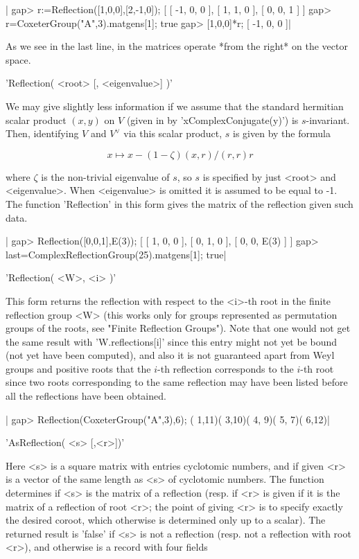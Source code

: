 |    gap> r:=Reflection([1,0,0],[2,-1,0]);
    [ [ -1, 0, 0 ], [ 1, 1, 0 ], [ 0, 0, 1 ] ]
    gap> r=CoxeterGroup("A",3).matgens[1];
    true
    gap> [1,0,0]*r;
    [ -1, 0, 0 ]|

As we see in the last line, in {\GAP} the matrices operate *from the right*
on the vector space.

'Reflection( <root> [, <eigenvalue>] )'

We  may  give   slightly  less  information  if  we   assume  that  the
standard hermitian  scalar product  $(x,y)$ on $V$  (given in  {\GAP} by
'x\*ComplexConjugate(y)') is $s$-invariant.  Then, identifying  $V$ and
$V^\vee$ via this scalar product, $s$ is given by the formula

$$ x\mapsto x-(1-\zeta)(x,r)/(r,r)r$$

where $\zeta$ is the non-trivial eigenvalue of $s$, so $s$ is specified
by just  <root> and  <eigenvalue>. When <eigenvalue>  is omitted  it is
assumed to be equal to -1. The function 'Reflection' in this form gives
the matrix of the reflection given such data.

|    gap> Reflection([0,0,1],E(3));
    [ [ 1, 0, 0 ], [ 0, 1, 0 ], [ 0, 0, E(3) ] ]
    gap> last=ComplexReflectionGroup(25).matgens[1];
    true|

'Reflection( <W>, <i> )'

This  form returns the  reflection with respect  to the <i>-th  root in the
finite  reflection group  <W> (this  works only  for groups  represented as
permutation groups of the roots, see "Finite Reflection Groups"). Note that
one  would not get the same result with 'W.reflections[i]' since this entry
might  not yet be  bound (not yet  have been computed),  and also it is not
guaranteed  apart  from  Weyl  groups  and  positive  roots that the $i$-th
reflection  corresponds to the $i$-th root since two roots corresponding to
the  same reflection may  have been listed  before all the reflections have
been obtained.

|    gap> Reflection(CoxeterGroup("A",3),6);
    ( 1,11)( 3,10)( 4, 9)( 5, 7)( 6,12)|


'AsReflection( <s> [,<r>])'

Here  <s> is a square matrix with  entries cyclotomic numbers, and if given
<r>  is  a  vector  of  the  same  length as <s> of cyclotomic numbers. The
function  determines if <s> is the matrix  of a reflection (resp. if <r> is
given  if it is the matrix of a reflection of root <r>; the point of giving
<r> is to specify exactly the desired coroot, which otherwise is determined
only  up to  a scalar).  The returned  result is  'false' if  <s> is  not a
reflection  (resp.  not  a  reflection  with  root <r>), and otherwise is a
record with four fields \:

